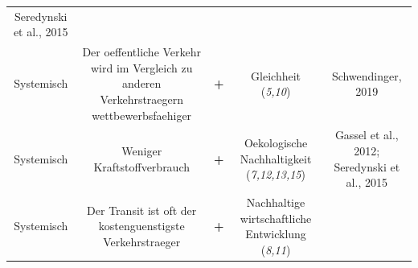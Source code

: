 \documentclass[
]{book}
\begin{document}
\begin{longtable}[]{@{}ccccc@{}}
\begin{minipage}[t]{0.17\columnwidth}
Seredynski et al., 2015\strut
\end{minipage}\tabularnewline
\begin{minipage}[t]{0.17\columnwidth}\centering
Systemisch\strut
\end{minipage} & \begin{minipage}[t]{0.16\columnwidth}\centering
Der oeffentliche Verkehr wird im Vergleich zu anderen Verkehrstraegern wettbewerbsfaehiger\strut
\end{minipage} & \begin{minipage}[t]{0.17\columnwidth}\centering
\textbf{+}\strut
\end{minipage} & \begin{minipage}[t]{0.17\columnwidth}\centering
Gleichheit (\emph{5,10})\strut
\end{minipage} & \begin{minipage}[t]{0.17\columnwidth}\centering
Schwendinger, 2019\strut
\end{minipage}\tabularnewline
\begin{minipage}[t]{0.17\columnwidth}\centering
Systemisch\strut
\end{minipage} & \begin{minipage}[t]{0.16\columnwidth}\centering
Weniger Kraftstoffverbrauch\strut
\end{minipage} & \begin{minipage}[t]{0.17\columnwidth}\centering
\textbf{+}\strut
\end{minipage} & \begin{minipage}[t]{0.17\columnwidth}\centering
Oekologische Nachhaltigkeit (\emph{7,12,13,15})\strut
\end{minipage} & \begin{minipage}[t]{0.17\columnwidth}\centering
Gassel et al., 2012; Seredynski et al., 2015\strut
\end{minipage}\tabularnewline
\begin{minipage}[t]{0.17\columnwidth}\centering
Systemisch\strut
\end{minipage} & \begin{minipage}[t]{0.16\columnwidth}\centering
Der Transit ist oft der kostenguenstigste Verkehrstraeger\strut
\end{minipage} & \begin{minipage}[t]{0.17\columnwidth}\centering
\textbf{+}\strut
\end{minipage} & \begin{minipage}[t]{0.17\columnwidth}\centering
Nachhaltige wirtschaftliche Entwicklung (\emph{8,11})\strut

\end{minipage}
\end{longtable}
\end{document}
